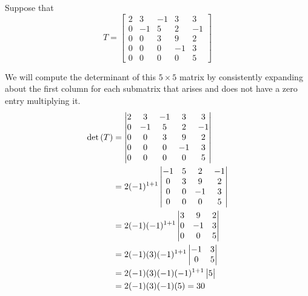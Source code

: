 \documentclass{ximera}
\begin{document}
\begin{example}
  Suppose that
  \[
    T=
    \begin{bmatrix}
      2 & 3 & -1 & 3 & 3\\
      0 & -1 & 5 & 2 & -1\\
      0 & 0 & 3 & 9 & 2\\
      0 & 0 & 0 & -1 & 3\\
      0 & 0 & 0 & 0 & 5
    \end{bmatrix}
  \]

  We will compute the determinant of this $5\times 5$ matrix by
  consistently expanding about the first column for each submatrix
  that arises and does not have a zero entry multiplying it.
  \begin{align*}
    \det\left(T\right)&=
                 \begin{vmatrix}
                   2 & 3 & -1 & 3 & 3\\
                   0 & -1 & 5 & 2 & -1\\
                   0 & 0 & 3 & 9 & 2\\
                   0 & 0 & 0 & -1 & 3\\
                   0 & 0 & 0 & 0 & 5
                 \end{vmatrix}\\
               &=2(-1)^{1+1}
                 \begin{vmatrix}
                   -1 & 5 & 2 & -1\\
                   0 & 3 & 9 & 2\\
                   0 & 0 & -1 & 3\\
                   0 & 0 & 0 & 5
                 \end{vmatrix}\\
               &=2(-1)(-1)^{1+1}
                 \begin{vmatrix}
                   3 & 9 & 2\\
                   0 & -1 & 3\\
                   0 & 0 & 5
                 \end{vmatrix}\\
               &=2(-1)(3)(-1)^{1+1}
                 \begin{vmatrix}
                   -1 & 3\\
                   0 & 5
                 \end{vmatrix}\\
               &=2(-1)(3)(-1)(-1)^{1+1}
                 \begin{vmatrix}
                   5
                 \end{vmatrix}\\
               &=2(-1)(3)(-1)(5)=30
  \end{align*}
\end{example}
\end{document}
